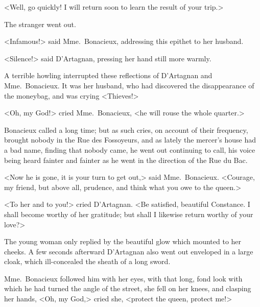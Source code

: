 <Well, go quickly! I will return soon to learn the result of your trip.> 

The stranger went out. 

<Infamous!> said Mme.~Bonacieux, addressing this epithet to her husband. 

<Silence!> said D'Artagnan, pressing her hand still more warmly. 

A terrible howling interrupted these reflections of D'Artagnan and Mme.~Bonacieux. It was her husband, who had discovered the disappearance of the moneybag, and was crying <Thieves!> 

<Oh, my God!> cried Mme.~Bonacieux, <he will rouse the whole quarter.> 

Bonacieux called a long time; but as such cries, on account of their frequency, brought nobody in the Rue des Fossoyeurs, and as lately the mercer's house had a bad name, finding that nobody came, he went out continuing to call, his voice being heard fainter and fainter as he went in the direction of the Rue du Bac. 

<Now he is gone, it is your turn to get out,> said Mme.~Bonacieux. <Courage, my friend, but above all, prudence, and think what you owe to the queen.> 

<To her and to you!> cried D'Artagnan. <Be satisfied, beautiful Constance. I shall become worthy of her gratitude; but shall I likewise return worthy of your love?> 

The young woman only replied by the beautiful glow which mounted to her cheeks. A few seconds afterward D'Artagnan also went out enveloped in a large cloak, which ill-concealed the sheath of a long sword. 

Mme.~Bonacieux followed him with her eyes, with that long, fond look with which he had turned the angle of the street, she fell on her knees, and clasping her hands, <Oh, my God,> cried she, <protect the queen, protect me!> 
